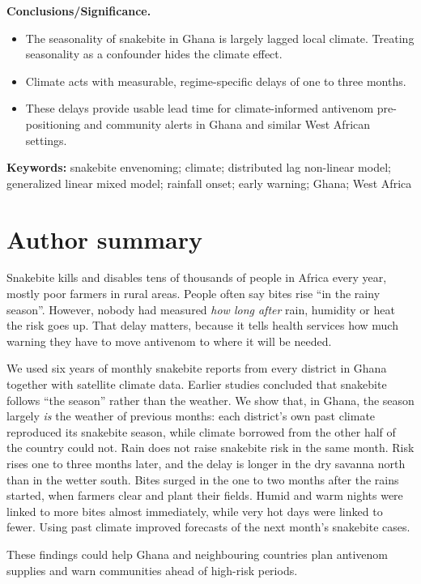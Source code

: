 \documentclass[11pt,a4paper]{article}
\providecommand{\tightlist}{\setlength{\itemsep}{0pt}\setlength{\parskip}{0pt}}
\begin{document}
\textbf{Conclusions/Significance.}

\begin{itemize}
\tightlist
\item
  The seasonality of snakebite in Ghana is largely lagged local climate. Treating seasonality as a confounder hides the climate effect.
\item
  Climate acts with measurable, regime-specific delays of one to three months.
\item
  These delays provide usable lead time for climate-informed antivenom pre-positioning and community alerts in Ghana and similar West African settings.
\end{itemize}

\textbf{Keywords:} snakebite envenoming; climate; distributed lag non-linear model; generalized linear mixed model; rainfall onset; early warning; Ghana; West Africa

\section*{Author summary}

Snakebite kills and disables tens of thousands of people in Africa every year, mostly poor farmers in rural areas. People often say bites rise ``in the rainy season''. However, nobody had measured \emph{how long after} rain, humidity or heat the risk goes up. That delay matters, because it tells health services how much warning they have to move antivenom to where it will be needed.

We used six years of monthly snakebite reports from every district in Ghana together with satellite climate data. Earlier studies concluded that snakebite follows ``the season'' rather than the weather. We show that, in Ghana, the season largely \emph{is} the weather of previous months: each district's own past climate reproduced its snakebite season, while climate borrowed from the other half of the country could not. Rain does not raise snakebite risk in the same month. Risk rises one to three months later, and the delay is longer in the dry savanna north than in the wetter south. Bites surged in the one to two months after the rains started, when farmers clear and plant their fields. Humid and warm nights were linked to more bites almost immediately, while very hot days were linked to fewer. Using past climate improved forecasts of the next month's snakebite cases.

These findings could help Ghana and neighbouring countries plan antivenom supplies and warn communities ahead of high-risk periods.
\end{document}
